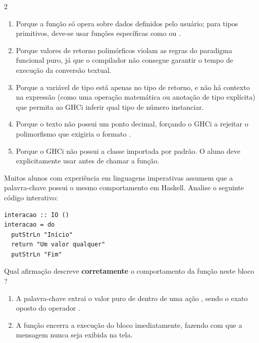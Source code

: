 \documentclass[a4paper,10pt,brazil]{article}
\begin{document}
\begin{multicols}{2}
\begin{enumerate}
  \item Porque a função  só opera sobre dados definidos pelo usuário; para tipos primitivos, deve-se usar funções específicas como  ou .

  \item Porque valores de retorno polimórficos violam as regras do paradigma funcional puro, já que o compilador não consegue garantir o tempo de execução da conversão textual.

  \item Porque a variável de tipo  está apenas no tipo de retorno, e não há contexto na expressão (como uma operação matemática ou anotação de tipo explícita) que permita ao GHCi inferir qual tipo de número instanciar.

  \item Porque o texto  não possui um ponto decimal, forçando o GHCi a rejeitar o polimorfismo que exigiria o formato .

  \item Porque o GHCi não possui a classe  importada por padrão. O aluno deve explicitamente usar  antes de chamar a função.


\end{enumerate}

Muitos alunos com experiência em linguagens imperativas assumem que a palavra-chave  possui o mesmo comportamento em Haskell. Analise o seguinte código interativo:

\begin{verbatim}
interacao :: IO ()
interacao = do
  putStrLn "Início"
  return "Um valor qualquer"
  putStrLn "Fim"
\end{verbatim}

Qual afirmação descreve \textbf{corretamente} o comportamento da função  neste bloco ?

\begin{enumerate}
  \item A palavra-chave  extrai o valor puro de dentro de uma ação , sendo o exato oposto do operador \haskellinline{<-}.

  \item A função  encerra a execução do bloco  imediatamente, fazendo com que a mensagem  nunca seja exibida na tela.


\end{enumerate}
\end{multicols}
\end{document}

